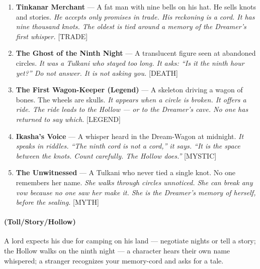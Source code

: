\begin{enumerate}
\item \textbf{Tinkanar Merchant} --- A fat man with nine bells on his hat. He sells knots and stories.
  \hfill \textit{He accepts only promises in trade. His reckoning is a cord. It has nine thousand knots. The oldest is tied around a memory of the Dreamer's first whisper.} [TRADE]
\item[J] \textbf{The Ghost of the Ninth Night} --- A translucent figure seen at abandoned circles.
  \hfill \textit{It was a Tulkani who stayed too long. It asks: ``Is it the ninth hour yet?'' Do not answer. It is not asking you.} [DEATH]
\item[Q] \textbf{The First Wagon-Keeper (Legend)} --- A skeleton driving a wagon of bones. The wheels are skulls.
  \hfill \textit{It appears when a circle is broken. It offers a ride. The ride leads to the Hollow --- or to the Dreamer's cave. No one has returned to say which.} [LEGEND]
\item[K] \textbf{Ikasha's Voice} --- A whisper heard in the Dream-Wagon at midnight.
  \hfill \textit{It speaks in riddles. ``The ninth cord is not a cord,'' it says. ``It is the space between the knots. Count carefully. The Hollow does.''} [MYSTIC]
\item[A] \textbf{The Unwitnessed} --- A Tulkani who never tied a single knot. No one remembers her name.
  \hfill \textit{She walks through circles unnoticed. She can break any vow because no one saw her make it. She is the Dreamer's memory of herself, before the sealing.} [MYTH]
\end{enumerate}

\paragraph*{(Toll/Story/Hollow)} A lord expects his due for camping on his land --- negotiate nights or tell a story; the Hollow walks on the ninth night --- a character hears their own name whispered; a stranger recognizes your memory-cord and asks for a tale.

